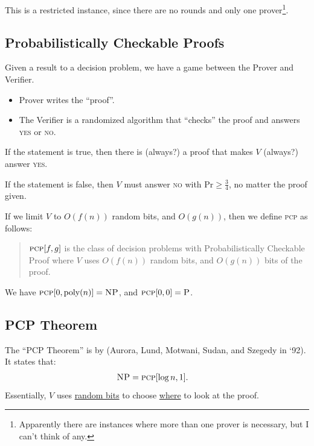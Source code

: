                     This is a restricted instance, since there are no rounds and only one prover\footnote{Apparently there are instances where more than one prover is necessary, but I can't think of any.}.
                \subsection{Probabilistically Checkable Proofs} %
                \label{sub:probabilistically_checkable_proofs}
                    Given a result to a decision problem, we have a game between the Prover and Verifier.
                    \begin{itemize}
                        \item Prover writes the ``proof''.
                        \item The Verifier is a randomized algorithm that ``checks'' the proof and answers \textsc{yes} or \textsc{no}.
                    \end{itemize}
                    If the statement is true, then there is (always?) a proof that makes $V$ (always?) answer \textsc{yes}.

                    If the statement is false, then $V$ must answer \textsc{no} with $\text{Pr} \ge \frac{3}{4}$, no matter the proof given.

                    If we limit $V$ to $O(f(n))$ random bits, and $O(g(n))$, then we define \textsc{pcp} as follows:

                    \begin{quote}
                        $\textsc{pcp}[f, g]$ is the class of decision problems with Probabilistically Checkable Proof where $V$ uses $O(f(n))$ random bits, and $O(g(n))$ bits of the proof.
                    \end{quote}
                    We have $\textsc{pcp}[0, \text{poly}(n)] = \textsc{NP}$, and $\textsc{pcp}[0, 0] = \textsc{P}$.
                \subsection{PCP Theorem} %
                \label{sub:pcp_theorem}
                    The ``PCP Theorem'' is by (Aurora, Lund, Motwani, Sudan, and Szegedy in `92).
                    It states that:
                    \begin{align*}
                        \textsc{NP} &= \textsc{pcp}[\log n, 1].
                    \end{align*}
                    Essentially, $V$ uses \uline{random bits} to choose \uline{where} to look at the proof.

